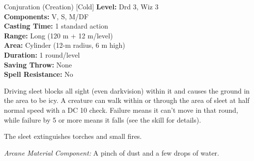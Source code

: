 {Conjuration (Creation) [Cold]}
{
	\textbf{Level:}
	Drd 3, Wiz 3\\
	\textbf{Components:}
	V, S, M/DF\\
	\textbf{Casting Time:}
	1 standard action\\
	\textbf{Range:}
	Long (120 m + 12 m/level)\\
	\textbf{Area:}
	Cylinder (12-m radius, 6 m high)\\
	\textbf{Duration:}
	1 round/level\\
	\textbf{Saving Throw:}
	None\\
	\textbf{Spell Resistance:}
	No\\
}
{
	Driving sleet blocks all sight (even darkvision) within it and causes the ground in the area to be icy. A creature can walk within or through the area of sleet at half normal speed with a DC 10  check. Failure means it can't move in that round, while failure by 5 or more means it falls (see the  skill for details).

	The sleet extinguishes torches and small fires.

	\textit{Arcane Material Component:}
	A pinch of dust and a few drops of water.

}
